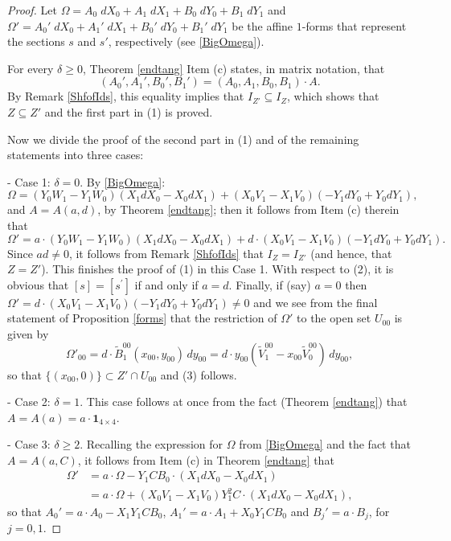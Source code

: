 \documentclass{amsart} %
\theoremstyle{definition}
\begin{document}
\begin{proof} Let
 $ \Omega = A_0\;dX_0+A_1\; dX_1+B_0\; dY_0+ B_1\;dY_1 $ and
 $ \Omega' = A_0'\;dX_0+A_1'\; dX_1+B_0'\; dY_0+ B_1'\;dY_1 $ be the affine $1$-forms that represent the
 sections $ s $ and $ s' $, respectively (see \eqref{BigOmega}).

For every $ \delta \geq 0 $, Theorem \ref{endtang} Item (c) states, in matrix notation, that
 $$ ( A_0',A_1',B_0', B_1' ) = ( A_0,A_1,B_0, B_1 )\cdot A. $$
 By Remark \ref{ShfofIds}, this equality implies that $ I_{Z'} \subseteq  I_{Z} $, which shows that
 $ Z \subseteq Z' $ and  the first part in (1) is proved.

Now we divide the proof of
the second part in (1) and of the remaining statements into three cases:

- Case 1: $ \delta = 0 $. By \eqref{BigOmega}:
  $$ \Omega = ( Y_0 W_1 - Y_1 W_0 ) (X_1 dX_0 - X_0 dX_1) + ( X_0 V_1 - X_1 V_0 ) (-Y_1 dY_0 + Y_0 dY_1), $$
  and $ A = A(a,d) $, by Theorem \ref{endtang}; then it follows from  Item (c) therein that
 $$
 \Omega' = a\cdot ( Y_0 W_1 - Y_1 W_0 ) (X_1 dX_0 - X_0 dX_1) + d\cdot ( X_0 V_1 - X_1 V_0 ) (-Y_1 dY_0 + Y_0 dY_1).
 $$
Since $ ad \neq 0 $, it follows from Remark \ref{ShfofIds} that $ I_Z = I_{Z'} $ (and hence, that
 $ Z = Z' $). This finishes the proof of (1) in this Case 1. With respect to (2), it is obvious that $ [s] = [s^{\prime}] $ if and only if $ a = d $. Finally, if (say) $ a = 0 $ then
 $ \Omega' = d\cdot( X_0 V_1 - X_1 V_0 ) (-Y_1 dY_0 + Y_0 dY_1) \neq 0 $ and we see from the final statement of Proposition \ref{forms} that the restriction of $ \Omega' $ to the open set $ U_{00} $ is given by
 $$
 \Omega'_{00} = d\cdot \tilde{B}_{1}^{00}\left( x_{00}, y_{00} \right)\, dy_{00}
  = d\cdot y_{00} \left( \tilde{V}_{1}^{00} - x_{00} \tilde{V}_{0}^{00} \right) \, dy_{00},
 $$
 so that $ \{ (x_{00}, 0) \} \subset Z' \cap U_{00} $ and (3) follows.

- Case 2:  $ \delta = 1 $.  This case  follows at once from the fact (Theorem \ref{endtang})
 that $ A = A(a) = a \cdot \mathbf{1}_{4\times 4} $.

- Case 3: $ \delta \geq 2 $. Recalling the expression for $ \Omega $ from \eqref{BigOmega} and the fact that $ A = A(a,C) $,
 it follows from  Item (c) in Theorem \ref{endtang} that
 \begin{equation}\label{deltageq2}
  \begin{aligned}
    \Omega' & = a\cdot\Omega - Y_1 C B_0 \cdot (X_1 dX_0 - X_0 dX_1) \\
            & = a\cdot\Omega + (X_0 V_1 - X_1 V_0) Y_1^2 C \cdot (X_1 dX_0 - X_0 dX_1),
  \end{aligned}
 \end{equation}
 so that $ A_0' = a\cdot A_0 - X_1 Y_1 C B_0 $,
         $ A_1' = a\cdot A_1 + X_0 Y_1 C B_0 $ and $ B_j' = a\cdot B_j $, for $ j = 0, 1 $.


\end{proof}
\end{document}
